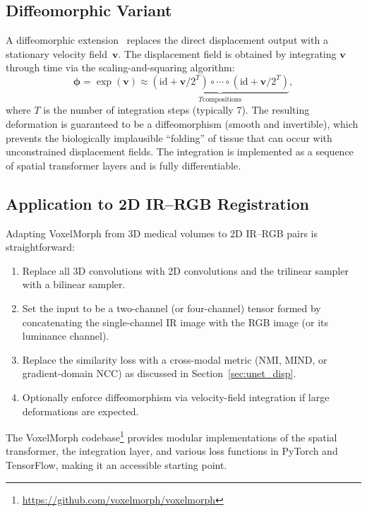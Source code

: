 \subsection{Diffeomorphic Variant}

A diffeomorphic extension~\cite{dalca2019unsupervised} replaces the
direct displacement output with a stationary velocity
field~$\mathbf{v}$.  The displacement field is obtained by integrating
$\mathbf{v}$ through time via the scaling-and-squaring algorithm:
\[
    \boldsymbol{\phi} = \exp(\mathbf{v})
        \approx \underbrace{(\mathrm{id} + \mathbf{v}/2^T)
        \circ \cdots \circ (\mathrm{id} + \mathbf{v}/2^T)}_{T \text{
        compositions}},
\]
where $T$ is the number of integration steps (typically 7).  The
resulting deformation is guaranteed to be a diffeomorphism (smooth and
invertible), which prevents the biologically implausible ``folding'' of
tissue that can occur with unconstrained displacement fields.  The
integration is implemented as a sequence of spatial transformer layers
and is fully differentiable.

\subsection{Application to 2D IR--RGB Registration}

Adapting VoxelMorph from 3D medical volumes to 2D IR--RGB pairs is
straightforward:

\begin{enumerate}
    \item Replace all 3D convolutions with 2D convolutions and the
          trilinear sampler with a bilinear sampler.
    \item Set the input to be a two-channel (or four-channel) tensor
          formed by concatenating the single-channel IR image with the
          RGB image (or its luminance channel).
    \item Replace the similarity loss with a cross-modal metric
          (NMI, MIND, or gradient-domain NCC) as discussed in
          Section~\ref{sec:unet_disp}.
    \item Optionally enforce diffeomorphism via velocity-field
          integration if large deformations are expected.
\end{enumerate}

The VoxelMorph codebase\footnote{\url{https://github.com/voxelmorph/voxelmorph}}
provides modular implementations of the spatial transformer, the
integration layer, and various loss functions in PyTorch and TensorFlow,
making it an accessible starting point.

